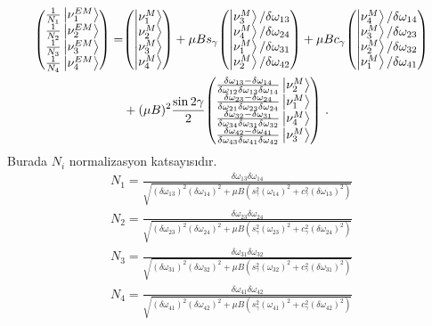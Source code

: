 \begin{align}\label{eqn:EMbasisKets}
    \nonumber \mqty(\frac{1}{N_{1}}\ket{\nu^{EM}_{1}}\\\frac{1}{N_{2}}\ket{\nu^{EM}_{2}}\\
    \frac{1}{N_{3}}\ket{\nu^{EM}_{3}}\\\frac{1}{N_{4}}\ket{\nu^{EM}_{4}}) =&
    \mqty(\ket{\nu^{M}_{1}}\\\ket{\nu^{M}_{2}}\\\ket{\nu^{M}_{3}}\\
    \ket{\nu^{M}_{4}})
    + \mu B s_{\gamma} \mqty(\ket{\nu^{M}_{3}}/\delta \omega_{13}\\
    \ket{\nu^{M}_{4}}/\delta \omega_{24} \\
    \ket{\nu^{M}_{1}}/\delta \omega_{31} \\
    \ket{\nu^{M}_{2}}/\delta \omega_{42})
    + \mu B c_{\gamma} \mqty(\ket{\nu^{M}_{4}}/\delta \omega_{14}\\
    \ket{\nu^{M}_{3}}/\delta \omega_{23} \\
    \ket{\nu^{M}_{2}}/\delta \omega_{32} \\
    \ket{\nu^{M}_{1}}/\delta \omega_{41}) \\
    &+ (\mu B)^{2} \frac{\sin 2\gamma}{2} \mqty(\frac{\delta \omega_{13} - 
    \delta \omega_{14}}{\delta \omega_{12} \delta \omega_{13} 
    \delta \omega_{14}} \ket{\nu^{M}_{2}} \\
    \frac{\delta \omega_{23} - \delta \omega_{24}}{\delta \omega_{21} 
    \delta \omega_{23} \delta \omega_{24}} \ket{\nu^{M}_{1}} \\
    \frac{\delta \omega_{32} - \delta \omega_{31}}{\delta \omega_{34} 
    \delta \omega_{31} \delta \omega_{32}} \ket{\nu^{M}_{4}} \\
    \frac{\delta \omega_{42} - \delta \omega_{41}}{\delta \omega_{43} 
    \delta \omega_{41} \delta \omega_{42}} \ket{\nu^{M}_{3}}) \text{ .}
\end{align}
Burada $ N_{i} $ normalizasyon katsayısıdır.
\begin{align}
	N_{1} = \frac{\delta \omega_{13}\delta \omega_{14}}{\sqrt{(\delta \omega_{13})^{2}(\delta \omega_{14})^{2}+\mu B (s^{2}_{\gamma} (\omega_{14})^{2}+ c_{\gamma}^{2}(\delta \omega_{13})^{2})}} \\
	N_{2} = \frac{\delta \omega_{23}\delta \omega_{24}}{\sqrt{(\delta \omega_{23})^{2}(\delta \omega_{24})^{2}+\mu B (s^{2}_{\gamma} (\omega_{23})^{2}+ c_{\gamma}^{2}(\delta \omega_{24})^{2})}} \\
	N_{3} = \frac{\delta \omega_{31}\delta \omega_{32}}{\sqrt{(\delta \omega_{31})^{2}(\delta \omega_{32})^{2}+\mu B (s^{2}_{\gamma} (\omega_{32})^{2}+ c_{\gamma}^{2}(\delta \omega_{31})^{2})}} \\
	N_{4} = \frac{\delta \omega_{41}\delta \omega_{42}}{\sqrt{(\delta \omega_{41})^{2}(\delta \omega_{42})^{2}+\mu B (s^{2}_{\gamma} (\omega_{41})^{2}+ c_{\gamma}^{2}(\delta \omega_{42})^{2})}}	
\end{align}
